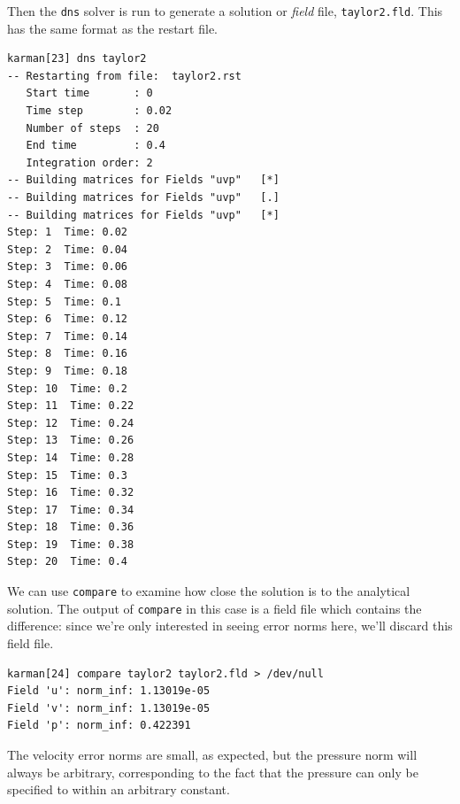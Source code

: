 \documentclass[11pt,a4paper]{report}
\begin{document}
Then the \texttt{dns} solver is run to generate a solution or
\emph{field} file, \texttt{taylor2.fld}.  This has the same format
as the restart file.
{\small
\begin{verbatim}
karman[23] dns taylor2
-- Restarting from file:  taylor2.rst
   Start time       : 0
   Time step        : 0.02
   Number of steps  : 20
   End time         : 0.4
   Integration order: 2
-- Building matrices for Fields "uvp"   [*]
-- Building matrices for Fields "uvp"   [.]
-- Building matrices for Fields "uvp"   [*]
Step: 1  Time: 0.02
Step: 2  Time: 0.04
Step: 3  Time: 0.06
Step: 4  Time: 0.08
Step: 5  Time: 0.1
Step: 6  Time: 0.12
Step: 7  Time: 0.14
Step: 8  Time: 0.16
Step: 9  Time: 0.18
Step: 10  Time: 0.2
Step: 11  Time: 0.22
Step: 12  Time: 0.24
Step: 13  Time: 0.26
Step: 14  Time: 0.28
Step: 15  Time: 0.3
Step: 16  Time: 0.32
Step: 17  Time: 0.34
Step: 18  Time: 0.36
Step: 19  Time: 0.38
Step: 20  Time: 0.4
\end{verbatim}
}

We can use \texttt{compare} to examine how close the solution is to the
analytical solution.  The output of \texttt{compare} in this case
is a field file which contains the difference: since we're only interested
in seeing error norms here, we'll discard this field file.
{\small
\begin{verbatim}
karman[24] compare taylor2 taylor2.fld > /dev/null
Field 'u': norm_inf: 1.13019e-05
Field 'v': norm_inf: 1.13019e-05
Field 'p': norm_inf: 0.422391
\end{verbatim}
}
\noindent
The velocity error norms are small, as expected, but the pressure norm
will always be arbitrary, corresponding to the fact that the pressure
can only be specified to within an arbitrary constant.
\end{document}
